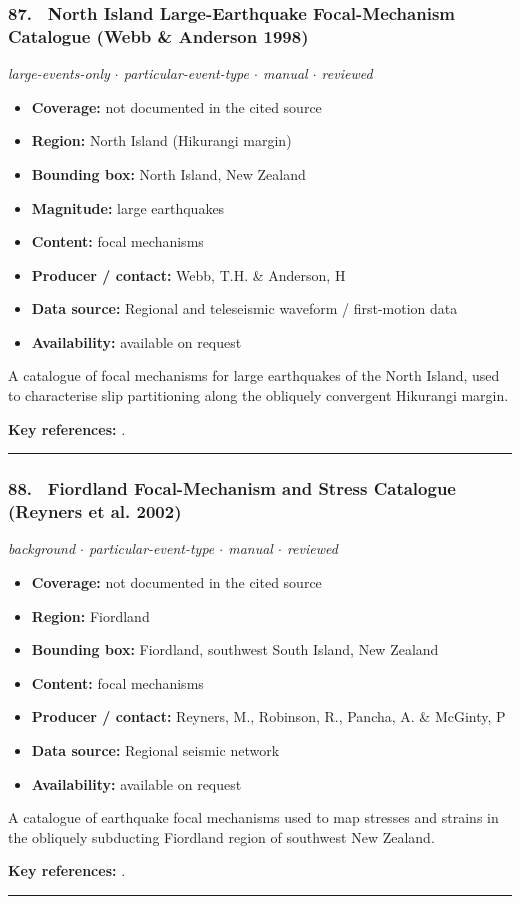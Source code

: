 \documentclass[10pt,a4paper]{article}
\newcommand{\catentryrule}{\par\vspace{3pt}\noindent\textcolor{rulegrey}{\rule{\linewidth}{0.3pt}}\par\vspace{5pt}}
\newcommand{\kv}[2]{\item \textbf{#1:} #2}
\begin{document}
\subsubsection*{\hypertarget{c:87}{87.}~ North Island Large-Earthquake Focal-Mechanism Catalogue (Webb \& Anderson 1998)}
{\small\itshape large-events-only $\cdot$ particular-event-type $\cdot$ manual $\cdot$ reviewed}\par\vspace{2pt}
\begin{itemize}[leftmargin=1.3em,itemsep=0.6pt,topsep=1pt,parsep=0pt]
\kv{Coverage}{not documented in the cited source}
\kv{Region}{North Island (Hikurangi margin)}
\kv{Bounding box}{North Island, New Zealand}
\kv{Magnitude}{large earthquakes}
\kv{Content}{focal mechanisms}
\kv{Producer / contact}{Webb, T.H. \& Anderson, H}
\kv{Data source}{Regional and teleseismic waveform / first-motion data}
\kv{Availability}{available on request}
\end{itemize}
\par\vspace{2pt}A catalogue of focal mechanisms for large earthquakes of the North Island, used to characterise slip partitioning along the obliquely convergent Hikurangi margin.
\par\vspace{2pt}\textbf{Key references:} \cite{Webb1998}.
\catentryrule
\subsubsection*{\hypertarget{c:88}{88.}~ Fiordland Focal-Mechanism and Stress Catalogue (Reyners et al. 2002)}
{\small\itshape background $\cdot$ particular-event-type $\cdot$ manual $\cdot$ reviewed}\par\vspace{2pt}
\begin{itemize}[leftmargin=1.3em,itemsep=0.6pt,topsep=1pt,parsep=0pt]
\kv{Coverage}{not documented in the cited source}
\kv{Region}{Fiordland}
\kv{Bounding box}{Fiordland, southwest South Island, New Zealand}
\kv{Content}{focal mechanisms}
\kv{Producer / contact}{Reyners, M., Robinson, R., Pancha, A. \& McGinty, P}
\kv{Data source}{Regional seismic network}
\kv{Availability}{available on request}
\end{itemize}
\par\vspace{2pt}A catalogue of earthquake focal mechanisms used to map stresses and strains in the obliquely subducting Fiordland region of southwest New Zealand.
\par\vspace{2pt}\textbf{Key references:} \cite{Reyners2002}.
\catentryrule
\end{document}
